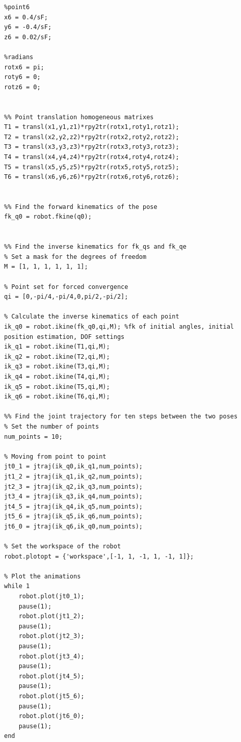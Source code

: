\documentclass[11pt,a4paper, margin=1in]{report}
\begin{document}
\begin{lstlisting}
%point6
x6 = 0.4/sF;
y6 = -0.4/sF;
z6 = 0.02/sF;

%radians
rotx6 = pi;
roty6 = 0;
rotz6 = 0;


%% Point translation homogeneous matrixes
T1 = transl(x1,y1,z1)*rpy2tr(rotx1,roty1,rotz1);
T2 = transl(x2,y2,z2)*rpy2tr(rotx2,roty2,rotz2);
T3 = transl(x3,y3,z3)*rpy2tr(rotx3,roty3,rotz3);
T4 = transl(x4,y4,z4)*rpy2tr(rotx4,roty4,rotz4);
T5 = transl(x5,y5,z5)*rpy2tr(rotx5,roty5,rotz5);
T6 = transl(x6,y6,z6)*rpy2tr(rotx6,roty6,rotz6);


%% Find the forward kinematics of the pose
fk_q0 = robot.fkine(q0);


%% Find the inverse kinematics for fk_qs and fk_qe
% Set a mask for the degrees of freedom
M = [1, 1, 1, 1, 1, 1];

% Point set for forced convergence
qi = [0,-pi/4,-pi/4,0,pi/2,-pi/2];

% Calculate the inverse kinematics of each point
ik_q0 = robot.ikine(fk_q0,qi,M); %fk of initial angles, initial position estimation, DOF settings
ik_q1 = robot.ikine(T1,qi,M);
ik_q2 = robot.ikine(T2,qi,M);
ik_q3 = robot.ikine(T3,qi,M);
ik_q4 = robot.ikine(T4,qi,M);
ik_q5 = robot.ikine(T5,qi,M);
ik_q6 = robot.ikine(T6,qi,M);

%% Find the joint trajectory for ten steps between the two poses
% Set the number of points
num_points = 10;

% Moving from point to point
jt0_1 = jtraj(ik_q0,ik_q1,num_points);
jt1_2 = jtraj(ik_q1,ik_q2,num_points);
jt2_3 = jtraj(ik_q2,ik_q3,num_points);
jt3_4 = jtraj(ik_q3,ik_q4,num_points);
jt4_5 = jtraj(ik_q4,ik_q5,num_points);
jt5_6 = jtraj(ik_q5,ik_q6,num_points);
jt6_0 = jtraj(ik_q6,ik_q0,num_points);

% Set the workspace of the robot
robot.plotopt = {'workspace',[-1, 1, -1, 1, -1, 1]};

% Plot the animations
while 1
	robot.plot(jt0_1);
	pause(1);
	robot.plot(jt1_2);
	pause(1);
	robot.plot(jt2_3);
	pause(1);
	robot.plot(jt3_4);
	pause(1);
	robot.plot(jt4_5);
	pause(1);
	robot.plot(jt5_6);
	pause(1);
	robot.plot(jt6_0);
	pause(1);
end
\end{lstlisting}
\end{document}
